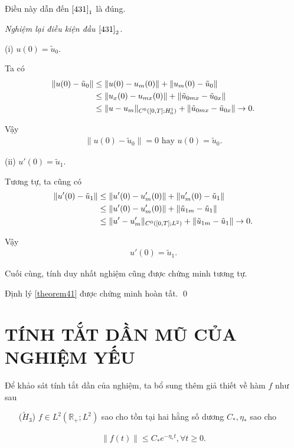 \documentclass[12pt,a4paper]{article}
\def\R{\mathbb{R}}
\theoremstyle{definition}
\theoremstyle{definition}
\begin{document}
Điều này dẫn đến $\eqref{431}_1$ là đúng.

\medskip

\textit{Nghiệm lại điều kiện đầu $\eqref{431}_2$.}

(i) $u(0) = \tilde{u}_0$.

Ta có
\begin{align}
    \|u(0) - \tilde{u}_0\| &\le \|u(0) - u_m(0)\| + \|u_m(0) - \tilde{u}_0\| \\
    &\le \|u_x(0) - u_{mx}(0)\| + \|\tilde{u}_{0mx} - \tilde{u}_{0x}\| \notag \\
    &\le \|u - u_m\|_{C^0([0,T];H^1_0)} + \|\tilde{u}_{0mx} - \tilde{u}_{0x}\| \to 0. \notag
\end{align}

Vậy
\begin{align}
     \|u(0) - \tilde{u}_0\| = 0 \text{ hay } u(0) = \tilde{u}_0.
\end{align}

(ii) $u'(0) = \tilde{u}_1$.

Tương tự, ta cũng có
\begin{align}
    \|u'(0) - \tilde{u}_1\| &\le \|u'(0) - u'_m(0)\| + \|u'_m(0) - \tilde{u}_1\| \\
    &\le \|u'(0) - u'_{m}(0)\| + \|\tilde{u}_{1m} - \tilde{u}_{1}\| \notag \\
    &\le \|u' - u'_m\|_{C^0([0,T];L^2)} + \|\tilde{u}_{1m} - \tilde{u}_{1}\| \to 0. \notag
\end{align}

Vậy
\begin{align}
    u'(0) = \tilde{u}_1.
\end{align}

Cuối cùng, tính duy nhất nghiệm cũng được chứng minh tương tự.

Định lý \ref{theorem41} được chứng minh hoàn tất. \qed
\pagebreak

\section[Tính tắt dần mũ của nghiệm yếu]{TÍNH TẮT DẦN MŨ CỦA NGHIỆM YẾU}

Để khảo sát tính tắt dần của nghiệm, ta bổ sung thêm giả thiết về hàm $f$ như sau
\begin{enumerate}
    \item[($\tilde{H}_3$)] $f \in L^2(\R_+; L^2)$ sao cho tồn tại hai hằng số dương $C_*, \eta_*$ sao cho
\end{enumerate}
\begin{align*}
    \|f(t)\| \le C_* e^{-\eta_* t}, \forall t \ge 0.
\end{align*}
\end{document}
